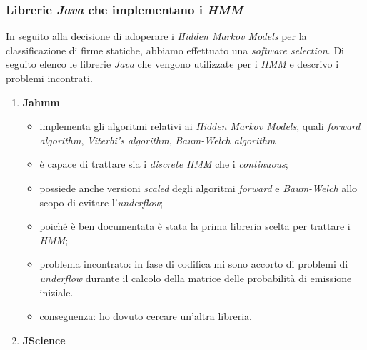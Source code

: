 \subsubsection*{Librerie \emph{Java} che implementano i \emph{HMM}}
\label{3.3.3.4}
In seguito alla decisione di adoperare i \emph{Hidden Markov Models} per la classificazione di firme statiche, abbiamo effettuato una \emph{software selection}. Di seguito elenco le librerie \emph{Java} che vengono utilizzate per i \emph{HMM} e descrivo i problemi incontrati.
\begin{enumerate}
\item\textbf{Jahmm}
	\begin{itemize}
	\item implementa gli algoritmi relativi ai \emph{Hidden Markov Models}, quali \emph{forward algorithm}, \emph{Viterbi's algorithm}, \emph{Baum-Welch algorithm}
	\item è capace di trattare sia i \emph{discrete HMM} che i \emph{continuous};
	\item possiede anche versioni \emph{scaled} degli algoritmi \emph{forward} e \emph{Baum-Welch} allo scopo di evitare l'\emph{underflow};
	\item poiché è ben documentata è stata la prima libreria scelta per trattare i \emph{HMM};
	\item problema incontrato: in fase di codifica mi sono accorto di problemi  di \emph{underflow} durante il calcolo della matrice delle probabilità di emissione iniziale.
	\item conseguenza: ho dovuto cercare un'altra libreria.
	\end{itemize}
\item\textbf{JScience}
\end{enumerate}
